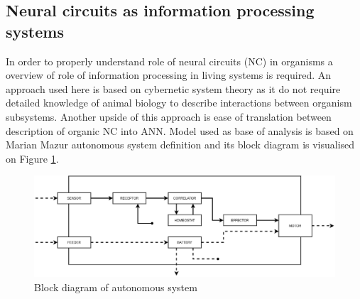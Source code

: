 \subsection{Neural circuits as information processing systems}
In order to properly understand role of neural circuits (NC) in organisms a overview of role
of information processing in living systems is required. An approach used here is based on 
cybernetic system theory \cite{Wiener2011} as it do not require detailed knowledge of animal
biology to describe interactions between organism subsystems. Another upside of this approach is 
ease of translation between description of organic NC into ANN.
Model used as base of analysis is based on Marian Mazur autonomous system definition 
\cite{Mazur1966} and its block diagram is visualised on Figure \ref{fig:auto_system}. 
\begin{figure}[htb] 
	\centering
	\includegraphics[width=\textwidth]{figures/auto_system}
	\caption{Block diagram of autonomous system}
	\label{fig:auto_system}
\end{figure}

